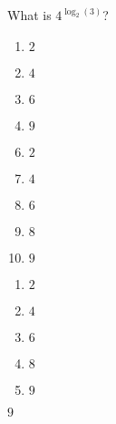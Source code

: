 


 What is $4^{\log_{2}(3)}$?


\ifsat
	\begin{enumerate}[label=\Alph*)]
		\item   $2$
		\item  $4$
		\item  $6$
		\item  $9$%
	\end{enumerate}
\else
\fi

\ifacteven
	\begin{enumerate}[label=\textbf{\Alph*.},itemsep=\fill,align=left]
		\setcounter{enumii}{5}
		\item   $2$
		\item  $4$
		\item  $6$
		\addtocounter{enumii}{1}
		\item  $8$
		\item  $9$%
	\end{enumerate}
\else
\fi

\ifactodd
	\begin{enumerate}[label=\textbf{\Alph*.},itemsep=\fill,align=left]
		\item   $2$
		\item  $4$
		\item  $6$
		\item  $8$
		\item  $9$%
	\end{enumerate}
\else
\fi

\ifgridin
  $9$%

\else
\fi

